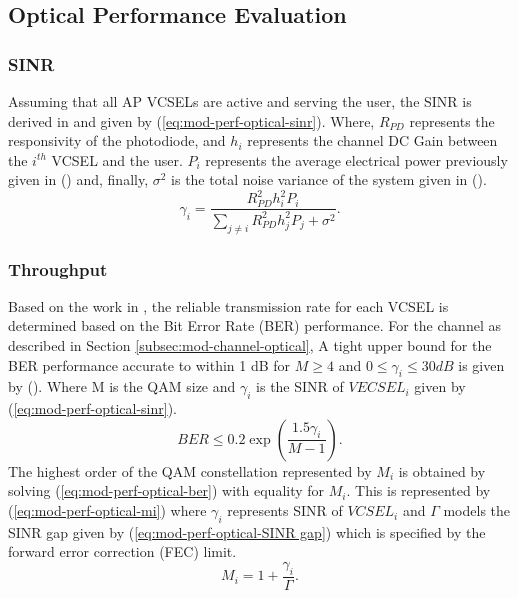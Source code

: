 \subsection{Optical Performance Evaluation}
\label{subsec:mod-perf-optical}
\subsubsection{SINR}
Assuming that all AP VCSELs are active and serving the user, the SINR is derived in \cite{sarbazi_tbs_2020} and given by (\ref{eq:mod-perf-optical-sinr}). Where, $R_{PD}$ represents the responsivity of the photodiode, and $h_i$ represents the channel DC Gain between the $i^{th}$ VCSEL and the user. $P_i$ represents the average electrical power previously given in () and, finally, $\sigma^2$ is the total noise variance of the system given in ().
\begin{equation}
    \gamma_i = \frac{R_{PD}^2h_i^2P_i}{\sum_{j\neq i}R_{PD}^2h_j^2P_j + \sigma^2}.
    \label{eq:mod-perf-optical-sinr}
\end{equation}

\subsubsection{Throughput}
Based on the work in \cite{sarbazi_tbs_2020}, the reliable transmission rate for each VCSEL is determined based on the Bit Error Rate (BER) performance. For the channel as described in Section \ref{subsec:mod-channel-optical}, A tight upper bound for the BER performance accurate to within 1 dB for $M\geq 4$ and $0 \leq \gamma_i \leq 30dB$ is given by ()\cite{goldsmith_variable-rate_1997}. Where M is the QAM size and $\gamma_i$ is the SINR of ${VECSEL}_i$ given by (\ref{eq:mod-perf-optical-sinr}).
\begin{equation}
    {BER} \leq 0.2\exp \left( \frac{1.5\gamma_i}{M - 1}\right).
    \label{eq:mod-perf-optical-ber}
\end{equation}
The highest order of the QAM constellation represented by $M_i$ is obtained by solving (\ref{eq:mod-perf-optical-ber}) with equality for $M_i$. This is represented by (\ref{eq:mod-perf-optical-mi}) where $\gamma_i$ represents SINR of ${VCSEL_i}$ and $\Gamma$ models the SINR gap given by (\ref{eq:mod-perf-optical-SINR gap}) which is specified by the forward error correction (FEC) limit\cite{sarbazi_tbs_2020}.
\begin{equation}
    M_i = 1 + \frac{\gamma_i}{\Gamma}.
    \label{eq:mod-perf-optical-mi}
\end{equation}

